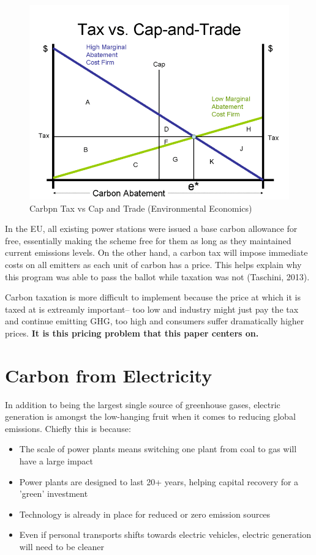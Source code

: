 \documentclass{article}
\begin{document}
\begin{figure}[H]
	\begin{center}
	\includegraphics[scale = .4]{Figures/captrade.png}
	\caption{Carbpn Tax vs Cap and Trade (Environmental Economics)}
	\end{center}
\end{figure}


In the EU, all existing power stations were issued a base carbon allowance for free, essentially making the scheme free for them as long as they maintained current emissions levels. On the other hand, a carbon tax will impose immediate costs on all emitters as each unit of carbon has a price. This helps explain why this program was able to pass the ballot while taxation was not (Taschini, 2013). \*

Carbon taxation is more difficult to implement because the price at which it is taxed at is extreamly important-- too low and industry might just pay the tax and continue emitting GHG, too high and consumers suffer dramatically higher prices. {\bf It is this pricing problem that this paper centers on.}


\section{Carbon from Electricity}
In addition to being the largest single source of greenhouse gases, electric generation is amongst the low-hanging fruit when it comes to reducing global emissions. Chiefly this is because: 

\begin{itemize}
	\item The scale of power plants means switching one plant from coal to gas will have a large impact
	\item Power plants are designed to last 20+ years, helping capital recovery for a 'green' investment
	\item Technology is already in place for reduced or zero emission sources
	\item Even if personal transports shifts towards electric vehicles, electric generation will need to be cleaner 
\end{itemize}
\end{document}
